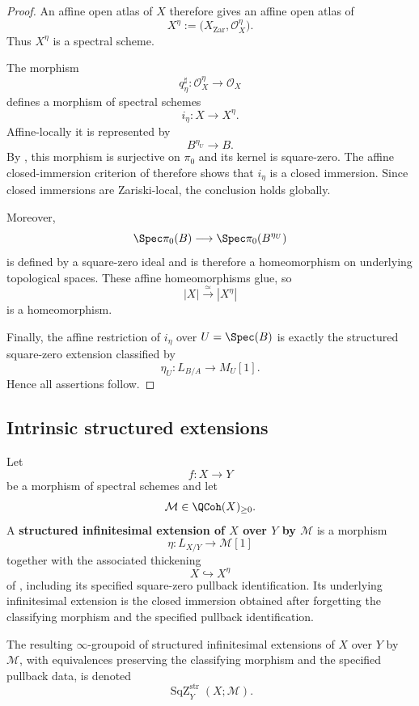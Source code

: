 \begin{proof}
An affine open atlas of \(X\) therefore gives an affine open atlas of
\[
    X^\eta
    :=
    \bigl(
        X_{\mathrm{Zar}},
        \mathcal O_X^\eta
    \bigr).
\]
Thus \(X^\eta\) is a spectral scheme.

The morphism
\[
    q_\eta^\sharp
    \colon
    \mathcal O_X^\eta
    \longrightarrow
    \mathcal O_X
\]
defines a morphism of spectral schemes
\[
    i_\eta
    \colon
    X
    \longrightarrow
    X^\eta.
\]
Affine-locally it is represented by
\[
    B^{\eta_U}
    \longrightarrow
    B.
\]
By , this morphism is
surjective on \(\pi_0\) and its kernel is square-zero. The affine
closed-immersion criterion of
 therefore shows that
\(i_\eta\) is a closed immersion. Since closed immersions are
Zariski-local, the conclusion holds globally.

Moreover,
\[
    \Spec\pi_0(B)
    \longrightarrow
    \Spec\pi_0(B^{\eta_U})
\]
is defined by a square-zero ideal and is therefore a homeomorphism on
underlying topological spaces. These affine homeomorphisms glue, so
\[
    |X|
    \xrightarrow{\simeq}
    |X^\eta|
\]
is a homeomorphism.

Finally, the affine restriction of \(i_\eta\) over \(U=\Spec(B)\) is
exactly the structured square-zero extension classified by
\[
    \eta_U
    \colon
    L_{B/A}
    \longrightarrow
    M_U[1].
\]
Hence all assertions follow.
\end{proof}

\subsection{Intrinsic structured extensions}

\begin{definition}
\label{def:structured-infinitesimal-extension}
Let
\[
    f
    \colon
    X
    \longrightarrow
    Y
\]
be a morphism of spectral schemes and let
\[
    \mathcal M
    \in
    \QCoh(X)_{\geq0}.
\]
A \textbf{structured infinitesimal extension of \(X\) over \(Y\) by
\(\mathcal M\)} is a morphism
\[
    \eta
    \colon
    L_{X/Y}
    \longrightarrow
    \mathcal M[1]
\]
together with the associated thickening
\[
    X
    \hookrightarrow
    X^\eta
\]
of , including its specified
square-zero pullback identification. Its underlying infinitesimal
extension is the closed immersion obtained after forgetting the
classifying morphism and the specified pullback identification.

The resulting \(\infty\)-groupoid of structured infinitesimal extensions
of \(X\) over \(Y\) by \(\mathcal M\), with equivalences preserving the
classifying morphism and the specified pullback data, is denoted
\[
    \operatorname{SqZ}^{\mathrm{str}}_Y(X;\mathcal M).
\]
\end{definition}

